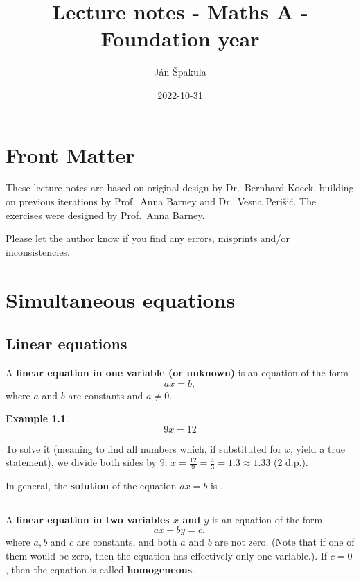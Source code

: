 \documentclass[
  12pt,
  oneside]{book}
\title{Lecture notes - Maths A - Foundation year}
\author{Ján Špakula}
\date{2022-10-31}
\theoremstyle{definition}
\theoremstyle{definition}
\newtheorem{example}{Example}[chapter]
\theoremstyle{definition}
\theoremstyle{definition}
\theoremstyle{remark}
\begin{document}
\maketitle

{
\setcounter{tocdepth}{1}
\tableofcontents
}
\hypertarget{front-matter}{%
\chapter*{Front Matter}\label{front-matter}}

These lecture notes are based on original design by Dr.~Bernhard Koeck, building on previous iterations by Prof.~Anna Barney and Dr.~Vesna Perišić. The exercises were designed by Prof.~Anna Barney.

Please let the author know if you find any errors, misprints and/or inconsistencies.

\hypertarget{simeq}{%
\chapter{Simultaneous equations}\label{simeq}}

\hypertarget{linear-equations}{%
\section{Linear equations}\label{linear-equations}}

A \textbf{linear equation in one variable (or unknown)} is an equation of the form
\[ax=b,\]
where \(a\) and \(b\) are constants and \(a\neq 0\).

\begin{example}
\protect\hypertarget{exm:unnamed-chunk-3}{}\label{exm:unnamed-chunk-3}\[9x=12\]
\end{example}

To solve it (meaning to find all numbers which, if substituted for \(x\), yield a true statement), we divide both sides by \(9\): \(x = \frac{12}{9} = \frac{4}{3} = 1.\overline{3} \approx 1.33\) (2 d.p.).

In general, the \textbf{solution} of the equation \(ax=b\) is .

\begin{center}\rule{0.5\linewidth}{0.5pt}\end{center}

A \textbf{linear equation in two variables \(x\) and \(y\)} is an equation of the form
\[ax+by=c,\]
where \(a,b\) and \(c\) are constants, and both \(a\) and \(b\) are not zero. (Note that if one of them would be zero, then the equation has effectively only one variable.). If \(c=0\), then the equation is called \textbf{homogeneous}.
\end{document}
